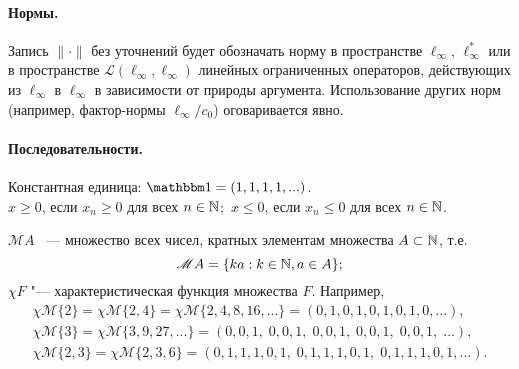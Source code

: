 \paragraph{Нормы.}
Запись $\|\cdot\|$ без уточнений будет обозначать норму в пространстве $\ell_\infty$, $\ell_\infty^*$
или в пространстве  $\mathcal L (\ell_\infty, \ell_\infty)$ линейных ограниченных операторов, действующих из $\ell_\infty$ в $\ell_\infty$ в зависимости от природы аргумента.
Использование других норм (например, фактор-нормы $\ell_\infty / c_0$)
оговаривается явно.

\newpage


\paragraph{Последовательности.} Константная единица: $\one = (1, 1, 1, 1, ...)$.
%
\\
$x\geq 0$, если $x_n \geq 0$ для всех $n\in \mathbb{N}$;\hfill~$x\leq 0$, если $x_n \leq 0$ для всех $n\in \mathbb{N}$.

$\mathscr{M}A$ ~--- множество всех чисел,
кратных элементам множества $A\subset\mathbb{N}$, т.е.
\begin{equation}
	\mathscr{M}A = \{ka: k\in\mathbb{N}, a\in A\}
	;
\end{equation}
$\chi F$ "--- характеристическая функция множества $F$.
Например,
\begin{gather}
	\chi \mathscr{M}\{2\} = \chi \mathscr{M}\{2, 4\} = \chi \mathscr{M}\{2,4,8,16,...\}
	= (0,1,0,1,0,1,0,1,0,...),
\\
	\chi \mathscr{M}\{3\} = \chi \mathscr{M}\{3,9,27,...\} = (0,0,1,\;0,0,1,\;0,0,1,\;0,0,1,\;0,0,1,\;...),
\\
	\chi \mathscr{M}\{2,3\} = \chi \mathscr{M}\{2,3,6\} = (0,1,1,1,0,1,\;0,1,1,1,0,1,\;0,1,1,1,0,1,...).
\end{gather}


